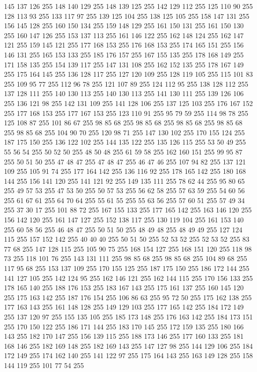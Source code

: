 145 137 126 255 148 140 129 255 148 139 125 255 142 129 112 255 125 110 90 255 128 113 93 255 133 117 97 255 139 125 104 255 138 125 105 255 158 147 131 255 156 145 128 255 160 150 134 255 159 148 129 255 161 150 131 255 161 150 130 255 160 147 126 255 153 137 113 255 161 146 122 255 162 148 124 255 162 147 121 255 159 145 121 255 177 168 153 255 176 168 153 255 174 165 151 255 156 146 131 255 165 153 133 255 185 176 157 255 167 155 135 255 178 168 149 255 171 158 135 255 154 139 117 255 147 131 108 255 162 152 135 255 178 167 149 255 175 164 145 255 136 128 117 255 127 120 109 255 128 119 105 255 115 101 83 255 109 95 77 255 112 96 78 255 121 107 89 255 124 112 95 255 138 128 112 255 137 128 111 255 140 130 113 255 140 130 113 255 141 130 111 255 139 126 106 255 136 121 98 255 142 131 109 255 141 128 106 255 137 125 103 255 176 167 152 255 177 168 153 255 177 167 153 255 123 110 91 255 95 79 59 255 114 98 78 255 125 108 87 255 101 86 67 255 98 85 68 255 98 85 68 255 98 85 68 255
98 85 68 255 98 85 68 255 104 90 70 255 120 98 71 255 147 130 102 255 170 155 124 255 187 175 150 255 136 122 102 255 144 135 122 255 135 126 115 255 53 50 49 255 55 56 54 255 50 52 50 255 48 50 48 255 61 59 58 255 162 160 151 255 99 95 87 255 50 51 50 255 47 48 47 255 47 48 47 255 46 47 46 255 107 94 82 255 137 121 109 255 105 91 74 255 177 164 142 255 136 116 92 255 178 165 142 255 180 168 144 255 156 141 120 255 141 121 92 255 149 135 111 255 78 62 44 255 95 80 65 255 49 57 53 255 47 53 50 255 50 57 53 255 56 62 58 255 57 63 59 255 54 60 56 255 61 67 61 255 64 70 64 255 55 61 55 255 55 63 56 255 57 60 51 255 57 49 34 255 37 30 17 255 101 88 72 255 167 155 133 255 177 165 142 255 163 146 120 255 156 142 120 255 161 147 127 255 152 138 117 255 130 119 104 255 161 153 140 255 60 58 56 255 46 48 47 255 50 51 50 255 48 49 48 255 48 49 49 255 127 124 115 255 157 152 142 255 40 40 40 255 50 51 50 255
52 53 52 255 52 53 52 255 83 77 68 255 147 128 115 255 105 90 75 255 168 154 127 255 168 151 120 255 118 98 73 255 118 101 76 255 143 131 111 255 98 85 68 255 98 85 68 255 104 89 68 255 117 95 68 255 153 137 109 255 170 155 125 255 187 175 150 255 186 172 144 255 141 127 105 255 142 124 95 255 162 146 121 255 162 144 115 255 170 156 133 255 178 165 140 255 188 176 153 255 183 167 143 255 175 161 137 255 160 145 120 255 175 163 142 255 187 176 154 255 106 86 63 255 95 72 50 255 175 162 138 255 177 163 143 255 161 148 128 255 149 129 103 255 177 165 142 255 184 172 149 255 137 120 97 255 155 135 105 255 185 173 148 255 176 163 142 255 184 173 151 255 170 150 122 255 186 171 144 255 183 170 145 255 172 159 135 255 180 166 143 255 182 170 147 255 156 139 115 255 188 173 146 255 177 160 133 255 181 168 146 255 182 169 148 255 182 169 143 255 147 127 98 255 144 129 106 255 184 172 149 255 174 162 140 255 141 122 97 255 175 164 143 255 163 149 128 255 158 144 119 255 101 77 54 255
